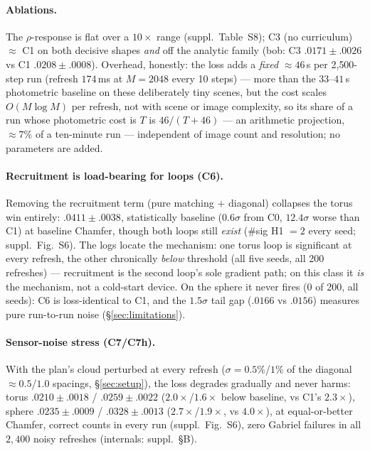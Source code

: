 \paragraph{Ablations.} The $\rho$-response is flat over a $10\times$
range (suppl.\ Table~S8); C3 (no curriculum)
$\approx$ C1 on both decisive shapes \emph{and} off the analytic family
(bob: C3 $.0171{\pm}.0026$ vs C1 $.0208{\pm}.0008$).
Overhead, honestly: the loss adds a \emph{fixed}
${\approx}46$\,s per 2{,}500-step run (refresh $174$\,ms at $M{=}2048$
every 10 steps) --- more than the $33$--$41$\,s photometric baseline on
these deliberately tiny scenes, but the cost scales $O(M\log M)$ per
refresh, not with scene or image complexity, so its share of a run whose
photometric cost is $T$ is $46/(T{+}46)$ --- an arithmetic projection, ${\approx}7\%$ of a ten-minute run ---
independent of image count and resolution; no parameters are added.

\paragraph{Recruitment is load-bearing for loops (C6).} Removing the
recruitment term (pure matching $+$ diagonal) collapses the torus win
entirely: $.0411\pm.0038$, statistically baseline ($0.6\sigma$ from C0,
$12.4\sigma$ worse than C1) at baseline Chamfer, though both loops
still \emph{exist} ($\#$sig H1 $= 2$ every seed; suppl.\ Fig.~S6). The
logs locate the mechanism: one torus loop is significant at every
refresh, the other chronically \emph{below} threshold (all five seeds,
all 200 refreshes) --- recruitment is the second loop's sole gradient
path; on this class it \emph{is} the mechanism, not a cold-start
device. On the sphere it never fires (0 of 200, all seeds): C6 is
loss-identical to C1, and the $1.5\sigma$ tail gap ($.0166$ vs $.0156$)
measures pure run-to-run noise (\S\ref{sec:limitations}).

\paragraph{Sensor-noise stress (C7/C7h).} With the plan's cloud
perturbed at every refresh ($\sigma = 0.5\%$/$1\%$ of the diagonal
${\approx}0.5$/$1.0$ spacings, \S\ref{sec:setup}), the loss degrades
gradually and never harms: torus $.0210{\pm}.0018$ / $.0259{\pm}.0022$
($2.0\times$/$1.6\times$ below baseline, vs C1's $2.3\times$), sphere
$.0235{\pm}.0009$ / $.0328{\pm}.0013$ ($2.7\times$/$1.9\times$, vs
$4.0\times$), at equal-or-better Chamfer, correct counts in every run
(suppl.\ Fig.~S6), zero Gabriel failures in all $2{,}400$ noisy
refreshes (internals: suppl.\ \S B).


